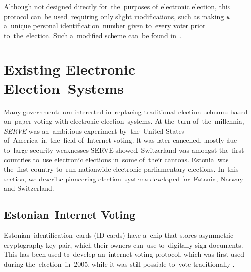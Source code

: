 Although not designed directly for~the~purposes of~electronic election, this protocol can~be used, requiring only slight modifications, such as making $u$ a~unique personal identification~number given to~every voter prior to~the~election. Such a~modified scheme can~be found in~\cite{Radwin}.
\section{Existing Electronic Election~Systems}
Many governments are interested in~replacing traditional election~schemes based on~paper voting with electronic election~systems. At the~turn of~the~millennia, \emph{SERVE} was an~ambitious experiment by~the~United States of~America~in~the~field of~Internet voting. It was later cancelled, mostly due to~large security weaknesses SERVE showed. Switzerland was amongst the~first countries to~use electronic elections in~some of~their cantons. Estonia~was the~first country to~run nationwide electronic parliamentary elections. In~this section, we describe pioneering election~systems developed for~Estonia, Norway and Switzerland.

\subsection{Estonian~Internet Voting}
Estonian~identification~cards (ID cards) have a~chip that stores asymmetric cryptography key pair, which their owners can~use to~digitally sign documents. This has been used to~develop an~internet voting protocol, which was first used during the~election~in~2005, while it was still possible to~vote traditionally \cite{Springall}. %

